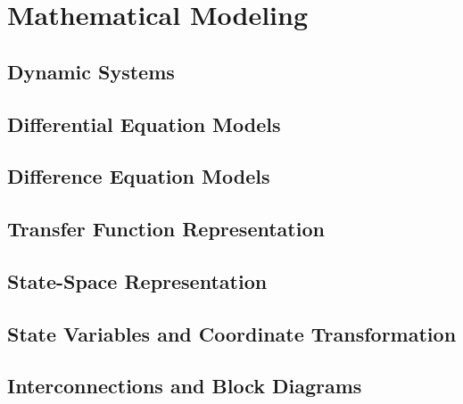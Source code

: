 \chapter{Mathematical Modeling} \label{ch:modeling}

	\section{Dynamic Systems}

	\section{Differential Equation Models}

	\section{Difference Equation Models}

	\section{Transfer Function Representation}

	\section{State-Space Representation}

	\section{State Variables and Coordinate Transformation}

	\section{Interconnections and Block Diagrams}